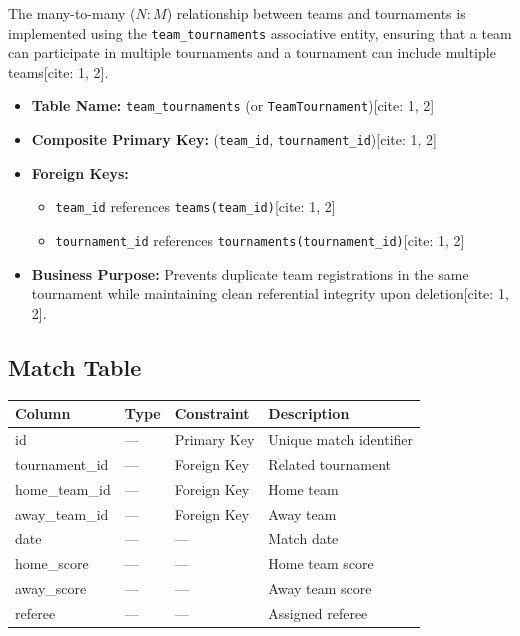 \documentclass[12pt,a4paper]{article}
\begin{document}
The many-to-many ($N:M$) relationship between teams and tournaments is implemented using the \texttt{team\_tournaments} associative entity, ensuring that a team can participate in multiple tournaments and a tournament can include multiple teams[cite: 1, 2].

\begin{itemize}
    \item \textbf{Table Name:} \texttt{team\_tournaments} (or \texttt{TeamTournament})[cite: 1, 2]
    \item \textbf{Composite Primary Key:} (\texttt{team\_id}, \texttt{tournament\_id})[cite: 1, 2]
    \item \textbf{Foreign Keys:} 
    \begin{itemize}
        \item \texttt{team\_id} references \texttt{teams(team\_id)}[cite: 1, 2]
        \item \texttt{tournament\_id} references \texttt{tournaments(tournament\_id)}[cite: 1, 2]
    \end{itemize}
    \item \textbf{Business Purpose:} Prevents duplicate team registrations in the same tournament while maintaining clean referential integrity upon deletion[cite: 1, 2].
\end{itemize}


\subsection{Match Table}

\begin{longtable}{llll}
\toprule
\textbf{Column} & \textbf{Type} & \textbf{Constraint} & \textbf{Description}\\
\midrule
id & --- & Primary Key & Unique match identifier\\
tournament\_id & --- & Foreign Key & Related tournament\\
home\_team\_id & --- & Foreign Key & Home team\\
away\_team\_id & --- & Foreign Key & Away team\\
date & --- & --- & Match date\\
home\_score & --- & --- & Home team score\\
away\_score & --- & --- & Away team score\\
referee & --- & --- & Assigned referee\\
\bottomrule
\end{longtable}
\end{document}
